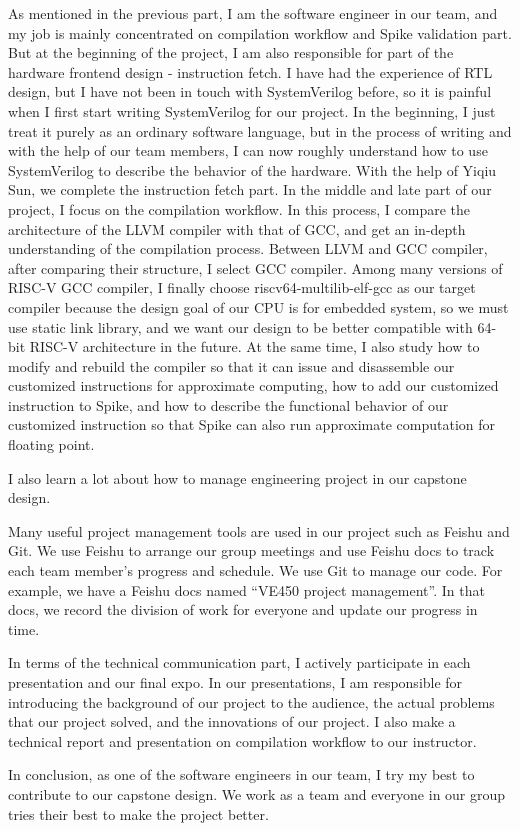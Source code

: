 As mentioned in the previous part, I am the software engineer in our team, and my job is mainly concentrated on compilation workflow and Spike validation part. But at the beginning of the project, I am also responsible for part of the hardware frontend design - instruction fetch. I have had the experience of RTL design, but I have not been in touch with SystemVerilog before, so it is painful when I first start writing SystemVerilog for our project. In the beginning, I just treat it purely as an ordinary software language, but in the process of writing and with the help of our team members, I can now roughly understand how to use SystemVerilog to describe the behavior of the hardware. With the help of Yiqiu Sun, we complete the instruction fetch part. In the middle and late part of our project, I focus on the compilation workflow. In this process, I compare the architecture of the LLVM compiler with that of GCC, and get an in-depth understanding of the compilation process. Between LLVM and GCC compiler, after comparing their structure, I select GCC compiler. Among many versions of RISC-V GCC compiler, I finally choose riscv64-multilib-elf-gcc as our target compiler because the design goal of our CPU is for embedded system, so we must use static link library, and we want our design to be better compatible with 64-bit RISC-V architecture in the future. At the same time, I also study how to modify and rebuild the compiler so that it can issue and disassemble our customized instructions for approximate computing, how to add our customized instruction to Spike, and how to describe the functional behavior of our customized instruction so that Spike can also run approximate computation for floating point.

I also learn a lot about how to manage engineering project in our capstone design. 

Many useful project management tools are used in our project such as Feishu and Git. We use Feishu to arrange our group meetings and use Feishu docs to track each team member’s progress and schedule. We use Git to manage our code. For example, we have a Feishu docs named ``VE450 project management''. In that docs, we record the division of work for everyone and update our progress in time.

In terms of the technical communication part, I actively participate in each presentation and our final expo. In our presentations, I am responsible for introducing the background of our project to the audience, the actual problems that our project solved, and the innovations of our project. I also make a technical report and presentation on compilation workflow to our instructor.

In conclusion, as one of the software engineers in our team, I try my best to contribute to our capstone design. We work as a team and everyone in our group tries their best to make the project better.
